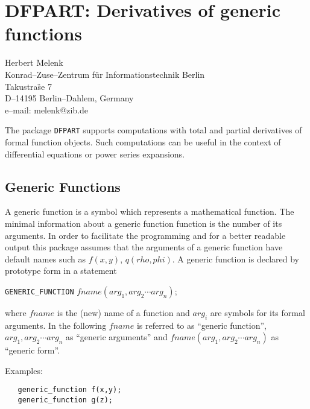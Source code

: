 \chapter{DFPART: Derivatives of generic functions}
\label{DFPART}

{\footnotesize
\begin{center}
Herbert Melenk \\
Konrad--Zuse--Zentrum f\"ur Informationstechnik Berlin \\
Takustra\"se 7 \\
D--14195 Berlin--Dahlem, Germany \\[0.05in]
e--mail: melenk@zib.de
\end{center}
}


The package {\tt DFPART} supports computations with total and partial
derivatives of formal function objects. Such computations can be
useful in the context of differential equations or power series
expansions.

\section{Generic Functions}

A generic function is a symbol which represents a mathematical
function. The minimal information about a generic function
function is the number of its arguments. In order to facilitate
the programming and for a better readable output this package
assumes that the arguments of a generic function have default
names such as $f(x,y)$, $q(rho,phi)$.
A generic function is declared by prototype form in a
statement

\vspace{.1in}
 {\tt GENERIC\_FUNCTION} $fname(arg_1,arg_2\cdots arg_n)$;
\vspace{.1in}

\noindent
where $fname$ is the (new) name of a function and $arg_i$ are
symbols for its formal arguments.  In the following $fname$ is
referred to as ``generic function'', $arg_1,arg_2\cdots arg_n$ as
``generic arguments'' and $fname(arg_1,arg_2\cdots arg_n)$ as
``generic form''.

Examples:

\begin{verbatim}
   generic_function f(x,y);
   generic_function g(z);
\end{verbatim}


